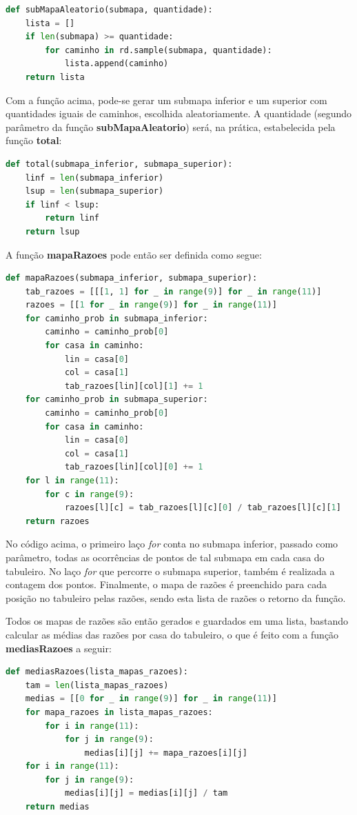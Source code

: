 \documentclass[12pt]{article}
\begin{document}
\begin{lstlisting}[language=Python]
def subMapaAleatorio(submapa, quantidade):
	lista = []
	if len(submapa) >= quantidade:
		for caminho in rd.sample(submapa, quantidade):
			lista.append(caminho)
	return lista
\end{lstlisting}

Com a função acima, pode-se gerar um submapa inferior e um superior com quantidades iguais de caminhos, escolhida aleatoriamente. A quantidade (segundo parâmetro da função \textbf{subMapaAleatorio}) será, na prática, estabelecida pela função \textbf{total}:

\begin{lstlisting}[language=Python]
def total(submapa_inferior, submapa_superior):
	linf = len(submapa_inferior)
	lsup = len(submapa_superior)
	if linf < lsup:
		return linf
	return lsup
\end{lstlisting}

A função \textbf{mapaRazoes} pode então ser definida como segue:

\begin{lstlisting}[language=Python]
def mapaRazoes(submapa_inferior, submapa_superior):
	tab_razoes = [[[1, 1] for _ in range(9)] for _ in range(11)] 
	razoes = [[1 for _ in range(9)] for _ in range(11)]
	for caminho_prob in submapa_inferior:
		caminho = caminho_prob[0]
		for casa in caminho:
			lin = casa[0]
			col = casa[1]
			tab_razoes[lin][col][1] += 1
	for caminho_prob in submapa_superior:
		caminho = caminho_prob[0]
		for casa in caminho:
			lin = casa[0]
			col = casa[1]
			tab_razoes[lin][col][0] += 1
	for l in range(11):
		for c in range(9):
			razoes[l][c] = tab_razoes[l][c][0] / tab_razoes[l][c][1]
	return razoes
\end{lstlisting}

No código acima, o primeiro laço \textit{for} conta no submapa inferior, passado como parâmetro, todas as ocorrências de pontos de tal submapa em cada casa do tabuleiro. No laço \textit{for} que percorre o submapa superior, também é realizada a contagem dos pontos. Finalmente, o mapa de razões é preenchido para cada posição no tabuleiro pelas razões, sendo esta lista de razões o retorno da função.

Todos os mapas de razões são então gerados e guardados em uma lista, bastando calcular as médias das razões por casa do tabuleiro, o que é feito com a função \textbf{mediasRazoes} a seguir:

\begin{lstlisting}[language=Python]
def mediasRazoes(lista_mapas_razoes):
	tam = len(lista_mapas_razoes)
	medias = [[0 for _ in range(9)] for _ in range(11)]
	for mapa_razoes in lista_mapas_razoes:
		for i in range(11):
			for j in range(9):
				medias[i][j] += mapa_razoes[i][j]
	for i in range(11):
		for j in range(9):
			medias[i][j] = medias[i][j] / tam
	return medias
\end{lstlisting}
\end{document}
